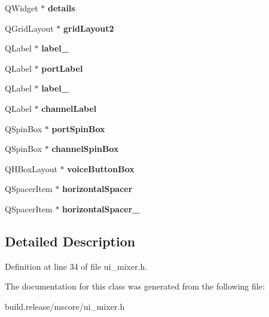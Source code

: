 \begin{DoxyCompactItemize}
\mbox{\label{class_ui___part_edit_base_ac45b8a32ab4d1a89deca81605d166633}} 
Q\+Widget $\ast$ {\bfseries details}
\item 
\mbox{\label{class_ui___part_edit_base_a7e8a2b0b2bf1c76b8d1fcc2edf194d6b}} 
Q\+Grid\+Layout $\ast$ {\bfseries grid\+Layout2}
\item 
\mbox{\label{class_ui___part_edit_base_af25bae6850927a4b3d5854890932a870}} 
Q\+Label $\ast$ {\bfseries label\+\_}
\item 
\mbox{\label{class_ui___part_edit_base_a0c8540120b93c67b8d1e1d44f5506d89}} 
Q\+Label $\ast$ {\bfseries port\+Label}
\item 
\mbox{\label{class_ui___part_edit_base_a8738e8487061eff5bdbfcb58aa70db3b}} 
Q\+Label $\ast$ {\bfseries label\+\_}
\item 
\mbox{\label{class_ui___part_edit_base_a931728362fea131a6b4851e7fdb5e2c6}} 
Q\+Label $\ast$ {\bfseries channel\+Label}
\item 
\mbox{\label{class_ui___part_edit_base_a9028ac79d264473676f92f6a4aea55d9}} 
Q\+Spin\+Box $\ast$ {\bfseries port\+Spin\+Box}
\item 
\mbox{\label{class_ui___part_edit_base_a7d311ae5b344000eff8bd426b34cd985}} 
Q\+Spin\+Box $\ast$ {\bfseries channel\+Spin\+Box}
\item 
\mbox{\label{class_ui___part_edit_base_a5eb6bcaadebb3d088bcdf74f8885c0fb}} 
Q\+H\+Box\+Layout $\ast$ {\bfseries voice\+Button\+Box}
\item 
\mbox{\label{class_ui___part_edit_base_a43fc89033e16ce0217181e6317dde49a}} 
Q\+Spacer\+Item $\ast$ {\bfseries horizontal\+Spacer}
\item 
\mbox{\label{class_ui___part_edit_base_ab08fd1f825eafeb9b77c0f4ddc0f127c}} 
Q\+Spacer\+Item $\ast$ {\bfseries horizontal\+Spacer\+\_}
\end{DoxyCompactItemize}


\subsection{Detailed Description}


Definition at line 34 of file ui\+\_\+mixer.\+h.



The documentation for this class was generated from the following file\+:\begin{DoxyCompactItemize}
\item 
build.\+release/mscore/ui\+\_\+mixer.\+h\end{DoxyCompactItemize}

